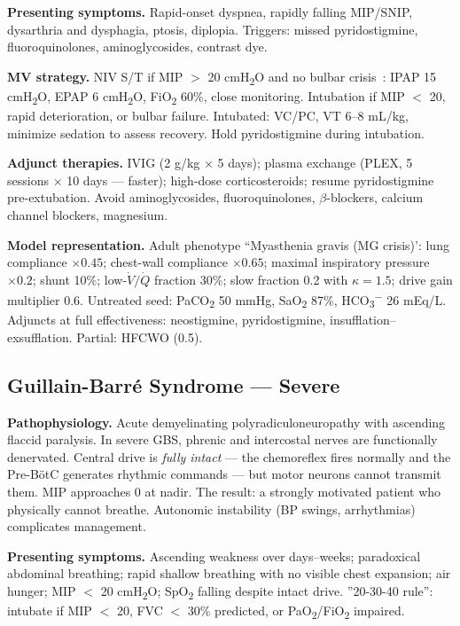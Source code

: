 \textbf{Presenting symptoms.} Rapid-onset dyspnea, rapidly falling MIP/SNIP, dysarthria and dysphagia, ptosis, diplopia. Triggers: missed pyridostigmine, fluoroquinolones, aminoglycosides, contrast dye.

\textbf{MV strategy.} NIV S/T if MIP $>$ 20 cmH\textsubscript{2}O and no bulbar crisis~\citep{thomas1997,gujjar2005}: IPAP 15 cmH\textsubscript{2}O, EPAP 6 cmH\textsubscript{2}O, FiO\textsubscript{2} 60\%, close monitoring. Intubation if MIP $<$ 20, rapid deterioration, or bulbar failure. Intubated: VC/PC, VT 6--8 mL/kg, minimize sedation to assess recovery. Hold pyridostigmine during intubation.

\textbf{Adjunct therapies.} IVIG (2 g/kg $\times$ 5 days); plasma exchange (PLEX, 5 sessions $\times$ 10 days --- faster); high-dose corticosteroids; resume pyridostigmine pre-extubation. Avoid aminoglycosides, fluoroquinolones, $\beta$-blockers, calcium channel blockers, magnesium.

\textbf{Model representation.} Adult phenotype ``Myasthenia gravis (MG crisis)': lung compliance $\times0.45$; chest-wall compliance $\times0.65$; maximal inspiratory pressure $\times0.2$; shunt 10\%; low-$\dot V/\dot Q$ fraction 30\%; slow fraction 0.2 with $\kappa=1.5$; drive gain multiplier 0.6. Untreated seed: PaCO\textsubscript{2} 50 mmHg, SaO\textsubscript{2} 87\%, HCO\textsubscript{3}\textsuperscript{$-$} 26 mEq/L. Adjuncts at full effectiveness: neostigmine, pyridostigmine, insufflation--exsufflation. Partial: HFCWO (0.5).

\subsection{Guillain-Barré Syndrome --- Severe}
\textbf{Pathophysiology.} Acute demyelinating polyradiculoneuropathy with ascending flaccid paralysis. In severe GBS, phrenic and intercostal nerves are functionally denervated. Central drive is \emph{fully intact} --- the chemoreflex fires normally and the Pre-BötC generates rhythmic commands --- but motor neurons cannot transmit them. MIP approaches 0 at nadir. The result: a strongly motivated patient who physically cannot breathe. Autonomic instability (BP swings, arrhythmias) complicates management.

\textbf{Presenting symptoms.} Ascending weakness over days--weeks; paradoxical abdominal breathing; rapid shallow breathing with no visible chest expansion; air hunger; MIP $<$ 20 cmH\textsubscript{2}O; SpO\textsubscript{2} falling despite intact drive. ''20-30-40 rule'': intubate if MIP $<$ 20, FVC $<$ 30\% predicted, or PaO\textsubscript{2}/FiO\textsubscript{2} impaired.

